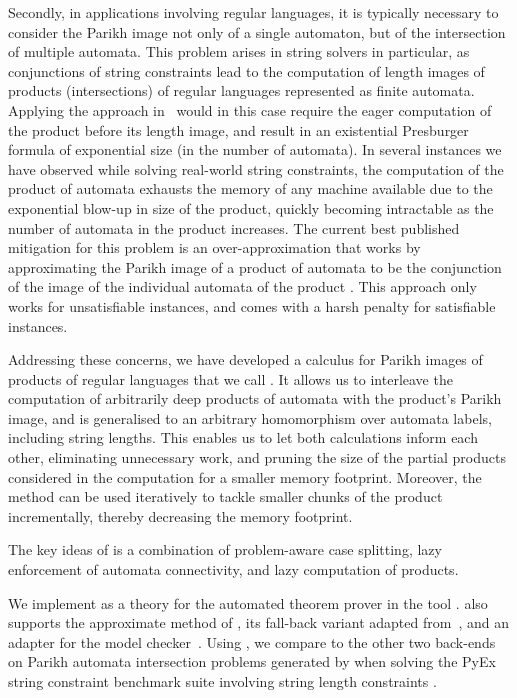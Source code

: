 Secondly, in applications involving regular languages, it is typically
necessary to consider the Parikh image not only of a single automaton,
but of the intersection of multiple automata. This problem arises in
string solvers in particular, as conjunctions of string constraints
lead to the computation of length images of products (intersections)
of regular languages represented as finite automata. Applying the
approach in~\cite{generate-parikh-image} would in this case require
the eager computation of the product before its length image, and
result in an existential Presburger formula of exponential size (in
the number of automata). In several instances we have observed while
solving real-world string constraints, the computation of the product
of automata exhausts the memory of any machine available due to the
exponential blow-up in size of the product, quickly becoming
intractable as the number of automata in the product increases. The
current best published mitigation for this problem is an
over-approximation that works by approximating the Parikh image of a
product of automata to be the conjunction of the image of the
individual automata of the product \cite{approximate-parikh}. This
approach only works for unsatisfiable instances, and comes with a
harsh penalty for satisfiable instances.

Addressing these concerns, we have developed a calculus for Parikh images of
products of regular languages that we call \Calculus{}. It allows us to
interleave the computation of arbitrarily deep products of automata with the
product's Parikh image, and is generalised to an arbitrary homomorphism over
automata labels, including string lengths. This enables us to let both
calculations inform each other, eliminating unnecessary work, and pruning the
size of the partial products considered in the computation for a smaller memory
footprint. Moreover, the method can be used iteratively to tackle smaller chunks
of the product incrementally, thereby decreasing the memory footprint.

The key ideas of \Calculus{} is a combination of problem-aware case splitting,
lazy enforcement of automata connectivity, and lazy computation of products.

We implement \Calculus{} as a theory for the \Princess{} automated theorem
prover in the tool \Catra. \Catra{} also supports the approximate method of
\cite{approximate-parikh}, its fall-back variant adapted
from~\cite{generate-parikh-image}, and an adapter for the \Nuxmv{} model
checker~\cite{nuxmv}. Using \Catra, we compare \Calculus{} to the other two
back-ends on \NrBenchmarks{} Parikh automata intersection problems generated by
\OstrichPlus{} when solving the PyEx string constraint benchmark suite involving
string length constraints \cite{pyex}.

